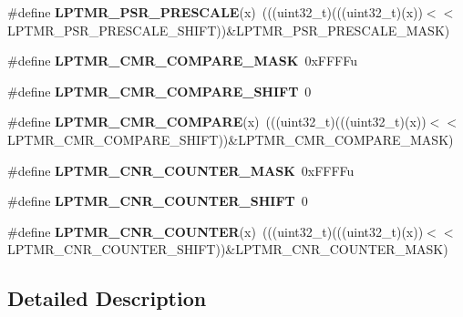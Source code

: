 \begin{DoxyCompactItemize}
\#define {\bfseries L\+P\+T\+M\+R\+\_\+\+P\+S\+R\+\_\+\+P\+R\+E\+S\+C\+A\+LE}(x)~(((uint32\+\_\+t)(((uint32\+\_\+t)(x))$<$$<$L\+P\+T\+M\+R\+\_\+\+P\+S\+R\+\_\+\+P\+R\+E\+S\+C\+A\+L\+E\+\_\+\+S\+H\+I\+FT))\&L\+P\+T\+M\+R\+\_\+\+P\+S\+R\+\_\+\+P\+R\+E\+S\+C\+A\+L\+E\+\_\+\+M\+A\+SK)
\item 
\mbox{\label{group___l_p_t_m_r___register___masks_ga55cc95c022500b353f1724f2cbfe7a8f}} 
\#define {\bfseries L\+P\+T\+M\+R\+\_\+\+C\+M\+R\+\_\+\+C\+O\+M\+P\+A\+R\+E\+\_\+\+M\+A\+SK}~0x\+F\+F\+F\+Fu
\item 
\mbox{\label{group___l_p_t_m_r___register___masks_gae1a525e22dc8b9c6960ae2e859a64232}} 
\#define {\bfseries L\+P\+T\+M\+R\+\_\+\+C\+M\+R\+\_\+\+C\+O\+M\+P\+A\+R\+E\+\_\+\+S\+H\+I\+FT}~0
\item 
\mbox{\label{group___l_p_t_m_r___register___masks_gad61ee0ea43ca3e503c2c16ed1b7b1696}} 
\#define {\bfseries L\+P\+T\+M\+R\+\_\+\+C\+M\+R\+\_\+\+C\+O\+M\+P\+A\+RE}(x)~(((uint32\+\_\+t)(((uint32\+\_\+t)(x))$<$$<$L\+P\+T\+M\+R\+\_\+\+C\+M\+R\+\_\+\+C\+O\+M\+P\+A\+R\+E\+\_\+\+S\+H\+I\+FT))\&L\+P\+T\+M\+R\+\_\+\+C\+M\+R\+\_\+\+C\+O\+M\+P\+A\+R\+E\+\_\+\+M\+A\+SK)
\item 
\mbox{\label{group___l_p_t_m_r___register___masks_ga134708aff0fe3bd31d703e32966c08fc}} 
\#define {\bfseries L\+P\+T\+M\+R\+\_\+\+C\+N\+R\+\_\+\+C\+O\+U\+N\+T\+E\+R\+\_\+\+M\+A\+SK}~0x\+F\+F\+F\+Fu
\item 
\mbox{\label{group___l_p_t_m_r___register___masks_ga3769a974a3d95250e32bb154fa134c3f}} 
\#define {\bfseries L\+P\+T\+M\+R\+\_\+\+C\+N\+R\+\_\+\+C\+O\+U\+N\+T\+E\+R\+\_\+\+S\+H\+I\+FT}~0
\item 
\mbox{\label{group___l_p_t_m_r___register___masks_ga8732990b7f3af802120a5e95000c963f}} 
\#define {\bfseries L\+P\+T\+M\+R\+\_\+\+C\+N\+R\+\_\+\+C\+O\+U\+N\+T\+ER}(x)~(((uint32\+\_\+t)(((uint32\+\_\+t)(x))$<$$<$L\+P\+T\+M\+R\+\_\+\+C\+N\+R\+\_\+\+C\+O\+U\+N\+T\+E\+R\+\_\+\+S\+H\+I\+FT))\&L\+P\+T\+M\+R\+\_\+\+C\+N\+R\+\_\+\+C\+O\+U\+N\+T\+E\+R\+\_\+\+M\+A\+SK)
\end{DoxyCompactItemize}


\subsection{Detailed Description}
